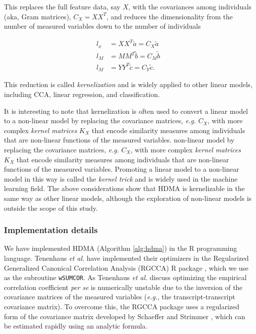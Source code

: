 \documentclass[
]{article}
\begin{document}
This replaces the full feature data, say \(X\), with the covariances
among individuals (aka, Gram matrices), \(C_X = XX^T\), and reduces the
dimensionality from the number of measured variables down to the number
of individuals

\begin{align}
l_x &= XX^T \tilde{a} = C_X \tilde{a} \\
l_M &= MM^T \tilde{b} = C_M \tilde{b} \\
l_M &= YY^T \tilde{c} = C_Y \tilde{c}.
\end{align}

This reduction is called \textit{kernelization}
\cite{tenenhaus2015kernel} and is widely applied to other linear models,
including CCA, linear regression, and classification.

It is interesting to note that kernelization is often used to convert a
linear model to a non-linear model by replacing the covariance matrices,
\textit{e.g.} \(C_X\), with more complex \textit{kernel matrices}
\(K_X\) that encode similarity measures among individuals that are
non-linear functions of the measured variables. non-linear model by
replacing the covariance matrices, \textit{e.g.} \(C_X\), with more
complex \textit{kernel matrices} \(K_X\) that encode similarity measures
among individuals that are non-linear functions of the measured
variables. Promoting a linear model to a non-linear model in this way is
called the \textit{kernel trick} and is widely used in the machine
learning field. The above considerations show that HDMA is kernelizable
in the same way as other linear models, although the exploration of
non-linear models is outside the scope of this study.

\subsubsection{Implementation details}\label{implementation-details}

We have implemented HDMA (Algorithm \ref{alg:hdma}) in the R programming
language. Tenenhaus \textit{et al.} have implemented their optimizers in
the Regularized Generalized Canonical Correlation Analysis (RGCCA) R
package \cite{girka2023multiblock}, which we use as the subroutine
\texttt{wSUMCOR}. As Tenenhaus \textit{et al.} discuss optimizing the
empirical correlation coefficient \textit{per se} is numerically
unstable due to the inversion of the covariance matrices of the measured
variables (\textit{e.g.}, the transcript-transcript covariance matrix).
To overcome this, the RGCCA package uses a regularized form of the
covariance matrix developed by Schaeffer and Strimmer
\cite{schafer2005shrinkage}, which can be estimated rapidly using an
analytic formula.
\end{document}
